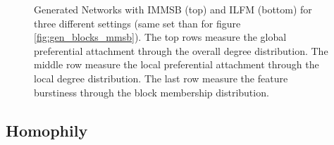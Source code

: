 \documentclass[a4paper, 12pt]{article}
\begin{document}
\begin{figure}[ht]
	\endminipage
    \caption{\tiny{Generated Networks with IMMSB (top) and ILFM (bottom) for three different settings (same set than for figure \ref{fig:gen_blocks_mmsb}). The top rows measure the global preferential attachment through the overall degree distribution. The middle row measure the local preferential attachment through the local degree distribution. The last row measure the feature burstiness through the block membership distribution.}}
	\label{fig:gen_burst}
\end{figure}

\clearpage

\subsection{Homophily}
\end{document}
